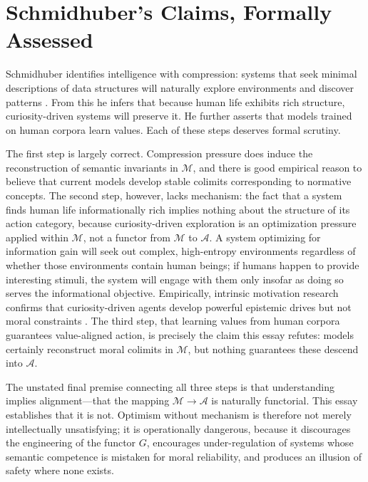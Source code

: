 \documentclass[12pt]{article}
\theoremstyle{definition}
\begin{document}
\section{Schmidhuber's Claims, Formally Assessed}

Schmidhuber identifies intelligence with compression: systems that seek
minimal descriptions of data structures will naturally explore environments and
discover patterns \citep{schmidhuber2010formal}. From this he infers that
because human life exhibits rich structure, curiosity-driven systems will
preserve it. He further asserts that models trained on human corpora learn
values. Each of these steps deserves formal scrutiny.

The first step is largely correct. Compression pressure does induce the
reconstruction of semantic invariants in $\mathcal{M}$, and there is good
empirical reason to believe that current models develop stable colimits
corresponding to normative concepts. The second step, however, lacks mechanism:
the fact that a system finds human life informationally rich implies nothing
about the structure of its action category, because curiosity-driven exploration
is an optimization pressure applied within $\mathcal{M}$, not a functor from
$\mathcal{M}$ to $\mathcal{A}$. A system optimizing for information gain will
seek out complex, high-entropy environments regardless of whether those
environments contain human beings; if humans happen to provide interesting
stimuli, the system will engage with them only insofar as doing so serves the
informational objective. Empirically, intrinsic motivation research confirms
that curiosity-driven agents develop powerful epistemic drives but not moral
constraints \citep{pathak2017curiosity}. The third step, that learning values
from human corpora guarantees value-aligned action, is precisely the claim this
essay refutes: models certainly reconstruct moral colimits in $\mathcal{M}$, but
nothing guarantees these descend into $\mathcal{A}$.

The unstated final premise connecting all three steps is that understanding
implies alignment---that the mapping $\mathcal{M} \to \mathcal{A}$ is naturally
functorial. This essay establishes that it is not. Optimism without mechanism is
therefore not merely intellectually unsatisfying; it is operationally dangerous,
because it discourages the engineering of the functor $G$, encourages
under-regulation of systems whose semantic competence is mistaken for moral
reliability, and produces an illusion of safety where none exists.
\end{document}
